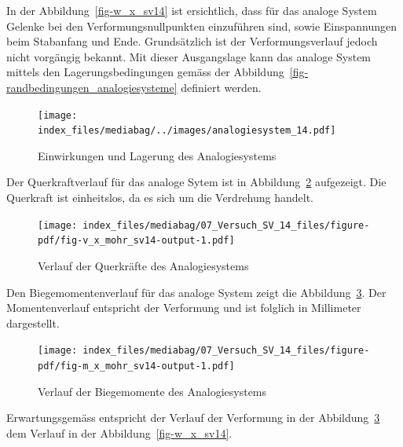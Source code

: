 \documentclass[
  12pt,
  letterpaper,
  egregdoesnotlikesansseriftitles]{scrreprt}
\begin{document}
In der Abbildung~\ref{fig-w_x_sv14} ist ersichtlich, dass für das
analoge System Gelenke bei den Verformungsnullpunkten einzuführen sind,
sowie Einspannungen beim Stabanfang und Ende. Grundsätzlich ist der
Verformungsverlauf jedoch nicht vorgängig bekannt. Mit dieser
Ausgangslage kann das analoge System mittels den Lagerungsbedingungen
gemäss der Abbildung~\ref{fig-randbedingungen_analogiesysteme} definiert
werden.

\begin{figure}[H]

{\centering \texttt{[image: index\_files/mediabag/../images/analogiesystem\_14.pdf]}

}

\caption{\label{fig-analogiesystem_sv14}Einwirkungen und Lagerung des
Analogiesystems}

\end{figure}

Der Querkraftverlauf für das analoge Sytem ist in
Abbildung~\ref{fig-v_x_mohr_sv14} aufgezeigt. Die Querkraft ist
einheitslos, da es sich um die Verdrehung handelt.

\begin{figure}[H]

{\centering \texttt{[image: index\_files/mediabag/07\_Versuch\_SV\_14\_files/figure-pdf/fig-v\_x\_mohr\_sv14-output-1.pdf]}

}

\caption{\label{fig-v_x_mohr_sv14}Verlauf der Querkräfte des
Analogiesystems}

\end{figure}

Den Biegemomentenverlauf für das analoge System zeigt die
Abbildung~\ref{fig-m_x_mohr_sv14}. Der Momentenverlauf entspricht der
Verformung und ist folglich in Millimeter dargestellt.

\begin{figure}[H]

{\centering \texttt{[image: index\_files/mediabag/07\_Versuch\_SV\_14\_files/figure-pdf/fig-m\_x\_mohr\_sv14-output-1.pdf]}

}

\caption{\label{fig-m_x_mohr_sv14}Verlauf der Biegemomente des
Analogiesystems}

\end{figure}

Erwartungsgemäss entspricht der Verlauf der Verformung in der
Abbildung~\ref{fig-m_x_mohr_sv14} dem Verlauf in der
Abbildung~\ref{fig-w_x_sv14}.
\end{document}
